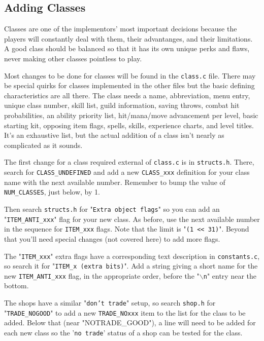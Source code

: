 \documentclass[11pt]{article}
\begin{document}
\subsection{Adding Classes}
Classes are one of the implementors' most important decisions because the players will constantly deal with them, their advantanges, and their limitations.  A good class should be balanced so that it has its own unique perks and flaws, never making other classes pointless to play.
\par
Most changes to be done for classes will be found in the \texttt{class.c} file. There may be special quirks for classes implemented in the other files but the basic defining characteristics are all there.  The class needs a name, abbreviation, menu entry, unique class number, skill list, guild information, saving throws, combat hit probabilities, an ability priority list, hit/mana/move advancement per level, basic starting kit, opposing item flags, spells, skills, experience charts, and level titles.  It's an exhaustive list, but the actual addition of a class isn't nearly as complicated as it sounds.
\par
The first change for a class required external of \texttt{class.c} is in \texttt{structs.h}. There, search for \texttt{CLASS\_UNDEFINED} and add a new \texttt{CLASS\_xxx} definition for your class name with the next available number.  Remember to bump the value of \texttt{NUM\_CLASSES}, just below, by 1.
\par
Then search \texttt{structs.h} for "\texttt{Extra object flags}" so you can add an "\texttt{ITEM\_ANTI\_xxx}" flag for your new class. As before, use the next available number in the sequence for \texttt{ITEM\_xxx} flags. Note that the limit is "\texttt{(1 << 31)}". Beyond that you'll need special changes (not covered here) to add more flags.
\par
The "\texttt{ITEM\_xxx}" extra flags have a corresponding text description in \texttt{constants.c}, so search it for "\texttt{ITEM\_x (extra bits)}".  Add a string giving a short name for the new \texttt{ITEM\_ANTI\_xxx} flag, in the appropriate order, before the "\texttt{$\backslash$n}" entry near the bottom.
\par
The shops have a similar "\texttt{don't trade}" setup, so search \texttt{shop.h} for "\texttt{TRADE\_NOGOOD}" to add a new \texttt{TRADE\_NOxxx} item to the list for the class to be
added.  Below that (near "NOTRADE\_GOOD"), a line will need to be added for each new class so the '\texttt{no trade}' status of a shop can be tested for the class.
\end{document}

